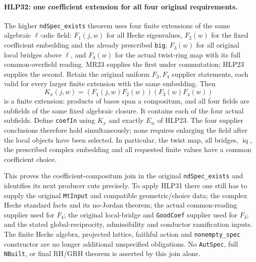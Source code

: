 \paragraph{HLP32: one coefficient extension for all four original requirements.}
\label{claim:HLP32}
The higher \texttt{nd\allowbreak Spec\_\allowbreak exists} theorem uses four finite
extensions of the same algebraic \(\ell\)-adic field: \(F_1(j,w)\)
for all Hecke eigenvalues, \(F_2(w)\) for the fixed coefficient
embedding and the already prescribed \texttt{big}, \(F_3(w)\)
for all original local bridges above \(\ell\), and \(F_4(w)\)
for the actual twist-ring map with its full common-overfield
reading. MR23 supplies the first under commutation; HLP23 supplies
the second. Retain the original uniform \(F_3,F_4\) supplier
statements, each valid for every larger finite extension with
the same embedding. Then
\[
 K_x(j,w)=(F_1(j,w)F_2(w))(F_3(w)F_4(w))             \tag{HLP.24}
\]
is a finite extension: products of bases span a compositum, and
all four fields are subfields of the same fixed algebraic closure.
It contains each of the four actual subfields. Define
\texttt{coef\allowbreak In} using \(K_x\) and exactly \(E_w\) of HLP23.
The four supplier conclusions therefore hold simultaneously;
none requires enlarging the field after the local objects have
been selected. In particular, the twist map, all bridges,
\(\operatorname{iq}\), the prescribed complex embedding and
all requested finite values have a common coefficient choice.

This proves the coefficient-compositum join in the original
\texttt{nd\allowbreak Spec\_\allowbreak exists} and identifies its next producer cuts
precisely. To apply HLP31 there one still has to supply the
original \texttt{Mt\allowbreak Input} and compatible geometric/choice data;
the complex Hecke standard facts and its no-Jordan theorem;
the actual common-reading supplier used for \(F_4\); the original
local-bridge and \texttt{Good\allowbreak Coef} supplier used for \(F_3\);
and the stated global-reciprocity, admissibility and conductor
ramification inputs. The finite Hecke algebra, projected lattice,
faithful action and \texttt{nonempty\_\allowbreak spec} constructor are no
longer additional unspecified obligations. No \texttt{Aut\allowbreak Spec},
full \texttt{NBuilt}, or final RH/GRH theorem is asserted by this
join alone.
